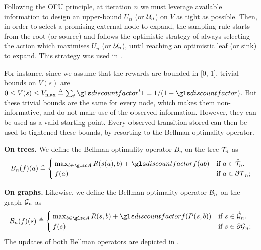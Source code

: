 Following the \gls{OFU} principle, at iteration $n$ we must leverage available information to design an upper-bound $U_n$ (or $\mathcal{U}_n$) on $V$ as tight as possible. Then, in order to select a promising external node to expand, the sampling rule starts from the root (or source) and follows the optimistic strategy of always selecting the action which maximises $U_n$ (or $\mathcal{U}_n$), until reaching an optimistic leaf (or sink) to expand. This strategy was used in \citep[e.g.][]{Kocsis2006, Hren2008, Bubeck2010, Busoniu2012optimistic}.

For instance, since we assume that the rewards are bounded in [0, 1], trivial bounds on $V(s)$ are
$0 \leq V(s) \leq V_{\max} \eqdef \sum_t \discount^t 1 ={1}/({1-\discount})$. But these trivial bounds are the same for every node, which makes them non-informative, and do not make use of the observed information. However, they can be used as a valid starting point. Every observed transition stored can then be used to tightened these bounds, by resorting to the Bellman optimality operator.

\begin{definition}
	\begin{leftbar}[defnbar]
	\label{def:bellman}
	{\textbf{On trees.}} We define the Bellman optimality operator $B_n$ on the tree $\mathcal{T}_n$ as
	\begin{equation}
	\label{eq:bellman-tree}
	B_n(f)(a) \eqdef \begin{cases}
	\max_{b\in \cA} R(s(a), b) + \discount f({ab})
	& \text{if $a\in\inte{\Tau}_n$.} \\
	f(a) & \text{if $a\in\ext{\Tau}_n$;}
	\end{cases}
	\end{equation}
	
	{\textbf{On graphs.}} Likewise, we define the Bellman optimality operator $\mathcal{B}_n$ on the graph $\mathcal{G}_n$ as
	\begin{equation}
	\label{eq:bellman-graph}
	\cB_n(f)(s) \eqdef \begin{cases}
	\max_{b\in \cA} R(s, b) + \discount f(P(s,b))
	& \text{if $s\in\inte{\cG}_n$.} \\
	f(s) & \text{if $s\in\ext{\cG}_n$;}
	\end{cases}
	\end{equation}
	The updates of both Bellman operators are depicted in .
	\end{leftbar}
\end{definition}

